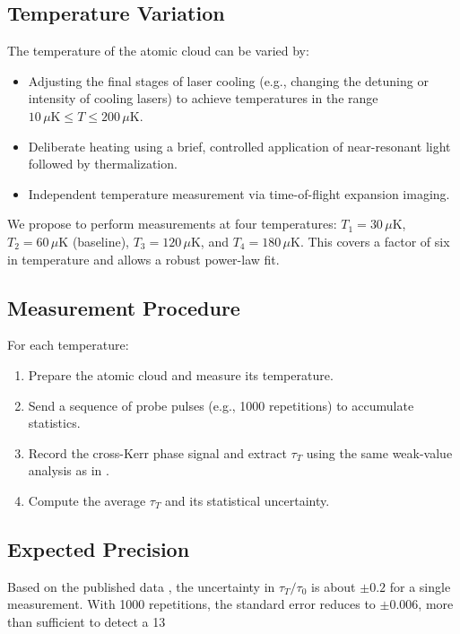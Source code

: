 \documentclass[12pt,a4paper]{article}
\begin{document}
	\subsection{Temperature Variation}
	The temperature of the atomic cloud can be varied by:
	\begin{itemize}
		\item Adjusting the final stages of laser cooling (e.g., changing the detuning or intensity of cooling lasers) to achieve temperatures in the range \(10\,\mu\mathrm{K} \le T \le 200\,\mu\mathrm{K}\).
		\item Deliberate heating using a brief, controlled application of near-resonant light followed by thermalization.
		\item Independent temperature measurement via time-of-flight expansion imaging.
	\end{itemize}
	
	We propose to perform measurements at four temperatures: \(T_1 = 30\,\mu\mathrm{K}\), \(T_2 = 60\,\mu\mathrm{K}\) (baseline), \(T_3 = 120\,\mu\mathrm{K}\), and \(T_4 = 180\,\mu\mathrm{K}\). This covers a factor of six in temperature and allows a robust power-law fit.
	
	\subsection{Measurement Procedure}
	For each temperature:
	\begin{enumerate}
		\item Prepare the atomic cloud and measure its temperature.
		\item Send a sequence of probe pulses (e.g., 1000 repetitions) to accumulate statistics.
		\item Record the cross-Kerr phase signal and extract \(\tau_T\) using the same weak-value analysis as in \cite{Angulo2024}.
		\item Compute the average \(\tau_T\) and its statistical uncertainty.
	\end{enumerate}
	
	\subsection{Expected Precision}
	Based on the published data \cite{Angulo2024}, the uncertainty in \(\tau_T/\tau_0\) is about \(\pm 0.2\) for a single measurement. With 1000 repetitions, the standard error reduces to \(\pm 0.006\), more than sufficient to detect a 13%
	
\end{document}
